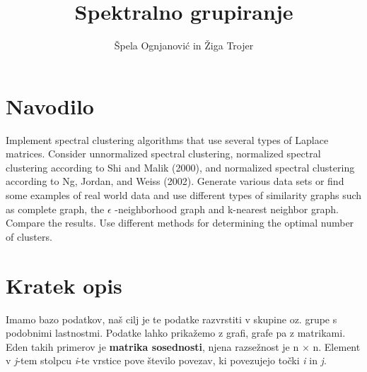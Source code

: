 \documentclass[a4paper, 10pt]{article}
\begin{document}
\begin{titlepage}
\title{Spektralno grupiranje}
\author{Špela Ognjanović in Žiga Trojer}
	\maketitle
\end{titlepage}


\section{Navodilo}
Implement spectral clustering algorithms that use several types of Laplace matrices. Consider unnormalized
spectral clustering, normalized spectral clustering according to Shi and Malik (2000), and normalized spectral clustering according to Ng, Jordan, and Weiss (2002). Generate various data sets or find some examples of real world data and use different types of similarity graphs such as complete graph, the
 $\epsilon$ -neighborhood graph and k-nearest neighbor graph. Compare the results.
Use different methods for determining the optimal number of clusters.

\section{Kratek opis}
Imamo bazo podatkov, naš cilj je te podatke razvrstiti v skupine oz. grupe s podobnimi lastnostmi. Podatke lahko prikažemo z grafi, grafe pa z matrikami. Eden takih primerov je \textbf{matrika sosednosti}, njena razsežnost je n $\times$ n. Element v \textsl{j}-tem stolpcu \textsl{i}-te vrstice pove število povezav, ki povezujejo točki \textsl{i} in \textsl{j}.
\end{document}
